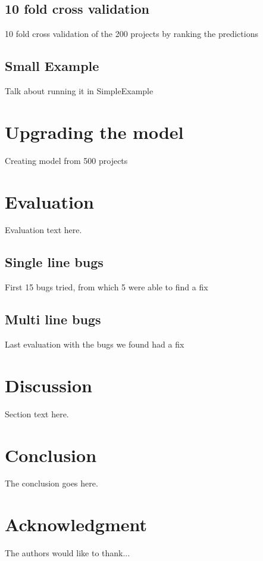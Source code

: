 \documentclass[conference]{IEEEtran}
\begin{document}
\subsection{10 fold cross validation}
10 fold cross validation of the 200 projects by ranking the predictions

\subsection{Small Example}
Talk about running it in SimpleExample

\section{Upgrading the model}
Creating model from 500 projects

\section{Evaluation}
Evaluation text here.


\subsection{Single line bugs}
First 15 bugs tried, from which 5 were able to find a fix

\subsection{Multi line bugs}
Last evaluation with the bugs we found had a fix

\section{Discussion}
Section text here.



\section{Conclusion}
The conclusion goes here.






\section*{Acknowledgment}
The authors would like to thank...
\end{document}
